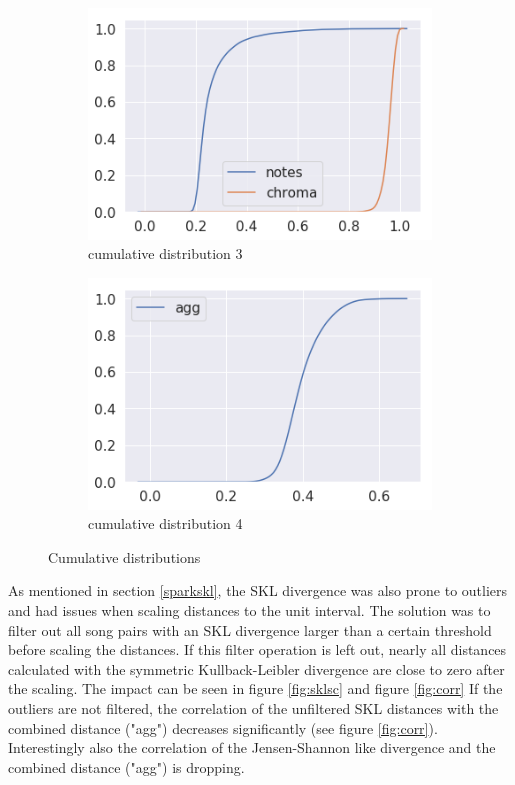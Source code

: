\begin{figure}[htbp]
{{			\begin{subfigure}{.495\textwidth}
				\centering     
				\includegraphics[scale=0.5]{Images/SparkFeat/cum3.png}
				\caption{cumulative distribution 3}
				\label{cum3}
			\end{subfigure}%
			\begin{subfigure}{.495\textwidth}
				\centering    
				\includegraphics[scale=0.5]{Images/SparkFeat/cum4.png}
				\caption{cumulative distribution 4}
				\label{cum4}
			\end{subfigure}	
	}}
	\caption{Cumulative distributions}
	\label{fig:cumdist}
\end{figure}
\FloatBarrier

\noindent As mentioned in section \ref{sparkskl}, the SKL divergence was also prone to outliers and had issues when scaling distances to the unit interval. The solution was to filter out all song pairs with an SKL divergence larger than a certain threshold before scaling the distances. If this filter operation is left out, nearly all distances calculated with the symmetric Kullback-Leibler divergence are close to zero after the scaling. The impact can be seen in figure \ref{fig:sklsc} and figure \ref{fig:corr}
\noindent If the outliers are not filtered, the correlation of the unfiltered SKL distances with the combined distance ("agg") decreases significantly (see figure \ref{fig:corr}). Interestingly also the correlation of the Jensen-Shannon like divergence and the combined distance ("agg") is dropping. 

